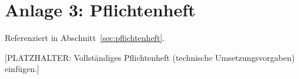 \section*{Anlage 3: Pflichtenheft}
\label{anh:pflichtenheft}
Referenziert in Abschnitt~\ref{sec:pflichtenheft}.

[PLATZHALTER: Vollst\"andiges Pflichtenheft (technische Umsetzungsvorgaben)
einf\"ugen.]
